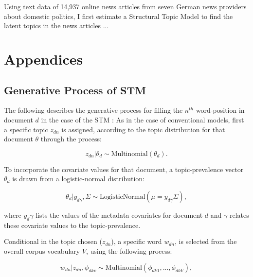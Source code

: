 \documentclass[12pt,a4paper,notitlepage]{article}
\begin{document}
Using text data of 14,937 online news articles from seven German news providers about domestic politics, I first estimate a Structural Topic Model to find the latent topics in the news articles ...

\pagebreak

\printbibliography

\appendix
\section{Appendices}

\subsection{Generative Process of STM}\label{a_generativeProcess}

 The following describes the generative process for filling the $n^{th}$ word-position in document $d$ in the case of the STM \citep{roberts_structural_2013}: As in the case of conventional models, first a specific topic $z_{dn}$ is assigned, according to the topic distribution for that document $\theta$ through the process:

\begin{equation}
	z_{dn}|\theta_d \sim \textrm{Multinomial}(\theta_d).
\end{equation}

To incorporate the covariate values for that document, a topic-prevalence vector $\theta_d$ is drawn from a logistic-normal distribution:

\begin{equation}
	\theta_d|y_{d\gamma},\Sigma \sim \textrm{LogisticNormal}(\mu = y_{d\gamma}\Sigma),
\end{equation}

where $y_d\gamma$ lists the values of the metadata covariates for document $d$ and $\gamma$ relates these covariate values to the topic-prevalence. 

Conditional in the topic chosen ($z_{dn}$), a specific word $w_{dn}$, is selected from the overall corpus vocabulary $V$, using the following process:

\begin{equation}
	w_{dn}|z_{dn},\phi_{dkv} \sim \textrm{Multinomial}(\phi_{dk1},...,\phi_{dkV}),
\end{equation}
\end{document}
